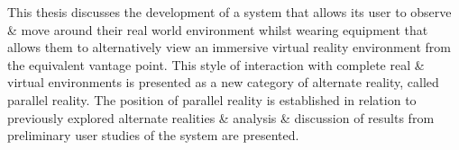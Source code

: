 This thesis discusses the development of a system that allows its user to observe \& move around their real world environment whilst wearing equipment that allows them to alternatively view an immersive virtual reality environment from the equivalent vantage point. This style of interaction with complete real \& virtual environments is presented as a new category of alternate reality, called parallel reality. The position of parallel reality is established in relation to previously explored alternate realities \& analysis \& discussion of results from preliminary user studies of the system are presented.